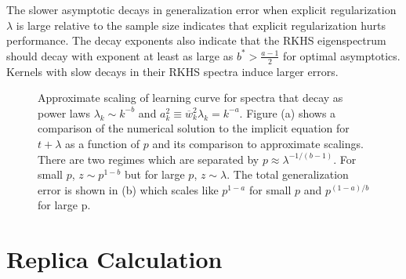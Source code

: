 \documentclass{article}
\begin{document}
The slower asymptotic decays in generalization error when explicit regularization $\lambda$ is large relative to the sample size indicates that explicit regularization hurts performance. The decay exponents also indicate that the RKHS eigenspectrum should decay with exponent at least as large as $b^* > \frac{a-1}{2}$ for optimal asymptotics. Kernels with slow decays in their RKHS spectra induce larger errors. 


\begin{figure}[t]
\caption{Approximate scaling of learning curve for spectra that decay as power laws $\lambda_k \sim k^{-b}$ and $a_k^2 \equiv \overline{w}_k^2 \lambda_k = k^{-a}$. Figure (a) shows a comparison of the numerical solution to the implicit equation for $t+\lambda$ as a function of $p$ and its comparison to approximate scalings. There are two regimes which are separated by $p \approx \lambda^{- 1/(b-1)}$. For small $p$, $z \sim p^{1-b}$ but for large $p$, $z \sim \lambda$. The total generalization error is shown in (b) which scales like $p^{1-a}$ for small $p$ and $p^{(1-a)/b}$ for large p. }
\label{fig:power_law_scaling}
\end{figure}


\section{Replica Calculation}\label{SIReplicaCalc}
\end{document}
